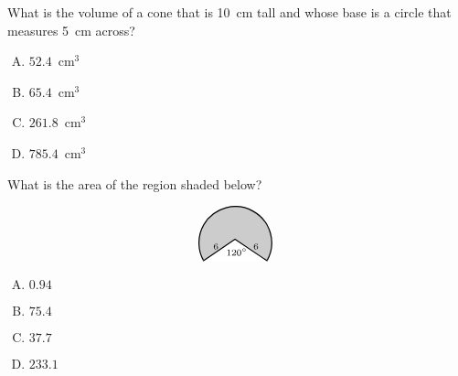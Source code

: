 \documentclass[12pt,letterpaper]{exam}
\begin{document}
\begin{questions}
\question What is the volume of a cone that is 10~cm tall and whose base is a circle that measures 5~cm across?
        \begin{enumerate}[A.]
        \item $52.4$~cm$^3$
        \item $65.4$~cm$^3$ %
        \item $261.8$~cm$^3$
        \item $785.4$~cm$^3$
        \end{enumerate}



\vfill



\question What is the area of the region shaded below?
	\[
	\begin{tikzpicture}
	\draw[line width=0.03cm,fill=gray!40] (0,0) arc (-30:210:1);
	\draw[line width=0.03cm,fill=white,white] (-1.75,0) -- (-0.875,0.6) -- (0.017,0) -- (-1.75,0);
	\draw[line width=0.03cm] (-1.75,0) -- (-0.875,0.6) -- (0.017,0);
	\node at (-0.3,0.4) {\scriptsize$6$};
	\node at (-1.4,0.4) {\scriptsize$6$};
	\node at (-0.83,0.25) {\scriptsize$120^\circ$};
	\end{tikzpicture}
	\]

\begin{enumerate}[A.]
\item $0.94$ %
\item $75.4$
\item $37.7$
\item $233.1$
\end{enumerate}


\end{questions}
\end{document}
